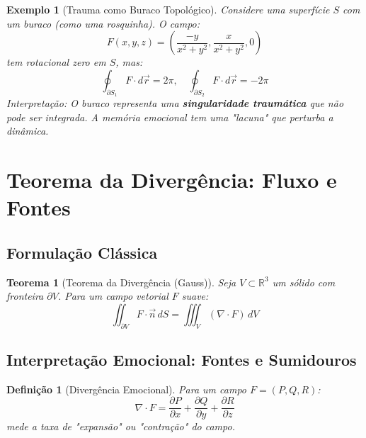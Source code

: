 \documentclass[12pt, a4paper]{article}
\newtheorem{definition}{Definição}
\newtheorem{theorem}{Teorema}
\newtheorem{example}{Exemplo}
\begin{document}
\begin{example}[Trauma como Buraco Topológico]
Considere uma superfície $S$ com um buraco (como uma rosquinha). O campo:
\[
F(x,y,z) = \left( \frac{-y}{x^2+y^2}, \frac{x}{x^2+y^2}, 0 \right)
\]
tem rotacional zero em $S$, mas:
\[
\oint_{\partial S_1} F \cdot d\vec{r} = 2\pi, \quad \oint_{\partial S_2} F \cdot d\vec{r} = -2\pi
\]
Interpretação: O buraco representa uma \textbf{singularidade traumática} que não pode ser integrada. A memória emocional tem uma "lacuna" que perturba a dinâmica.
\end{example}

\section{Teorema da Divergência: Fluxo e Fontes}

\subsection{Formulação Clássica}

\begin{theorem}[Teorema da Divergência (Gauss)]
Seja $V \subset \mathbb{R}^3$ um sólido com fronteira $\partial V$. Para um campo vetorial $F$ suave:
\[
\iint_{\partial V} F \cdot \vec{n} \, dS = \iiint_V (\nabla \cdot F) \, dV
\]
\end{theorem}

\subsection{Interpretação Emocional: Fontes e Sumidouros}

\begin{definition}[Divergência Emocional]
Para um campo $F = (P, Q, R)$:
\[
\nabla \cdot F = \frac{\partial P}{\partial x} + \frac{\partial Q}{\partial y} + \frac{\partial R}{\partial z}
\]
mede a taxa de "expansão" ou "contração" do campo.
\end{definition}

\begin{center}
\end{center}
\end{document}
